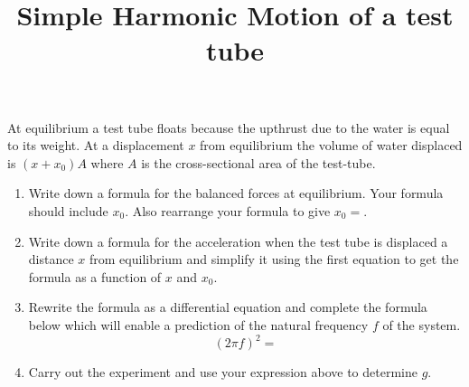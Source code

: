 \documentclass{article}
\title{Simple Harmonic Motion of a test tube}
\begin{document}
\maketitle\thispagestyle{empty}
At equilibrium a test tube floats because the upthrust due to the water is equal to its weight. At a displacement $x$ from equilibrium the volume of water displaced is $\left(x+x_0\right)A$ where $A$ is the cross-sectional area of the test-tube.
\begin{enumerate}
    \item Write down a formula for the balanced forces at equilibrium.  Your formula should include $x_0$. Also rearrange your formula to give $x_0=$.\vspace{2cm} 
    \item Write down a formula for the acceleration when the test tube is displaced a distance $x$ from equilibrium and simplify it using the first equation to get the formula as a function of $x$ and $x_0$. \vspace{3cm}
    \item Rewrite the formula as a differential equation and complete the formula below which will enable a prediction of the natural frequency $f$ of the system. \vspace{3cm} \[\left(2\pi f\right)^2 = \] 
    \item Carry out the experiment and use your expression above to determine $g$.
\end{enumerate}
\end{document}
